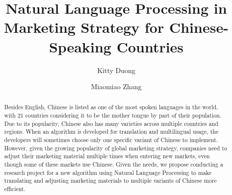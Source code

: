 \documentclass[sigconf]{acmart}
\begin{document}
\title{Natural Language Processing in Marketing Strategy for Chinese-Speaking Countries}
\author{Kitty Duong}

\author{Miaomiao Zhang}

\begin{abstract}
Besides English, Chinese is listed as one of the most spoken languages in the world, with 21 countries considering it to be the mother tongue by part of their population. Due to its popularity, Chinese also has many varieties across multiple countries and regions. When an algorithm is developed for translation and multilingual usage, the developers will sometimes choose only one specific variant of Chinese to implement. However, given the growing popularity of global marketing strategy, companies need to adjust their marketing material multiple times when entering new markets, even though some of these markets use Chinese. Given the needs, we propose conducting a research project for a new algorithm using Natural Language Processing to make translating and adjusting marketing materials to multiple variants of Chinese more efficient.
\end{abstract}
\maketitle
\end{document}
